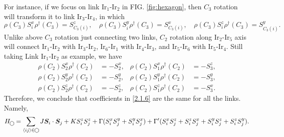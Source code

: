 \documentclass[10pt,nofootinbib]{revtex4}
\newcommand\hexagon{\mathop{\begin{tikzpicture}[scale=0.06,baseline]
		\draw (0,-1) -- (1.732,0) -- (1.732,2) -- (0,3) -- (-1.732,2) -- (-1.732,0) -- (0,-1);
	\end{tikzpicture}}}
\begin{document}
		For instance, if we focus on link $\mathrm{Ir}_1\text{-}\mathrm{Ir}_2$ in FIG. \ref{fig:hexagon}, then $C_3$ rotation will transform it to link $\mathrm{Ir}_3\text{-}\mathrm{Ir}_4$, in which
		\begin{equation}\label{2.2.2}
			\rho(C_3)S_i^x\rho^\dagger(C_3)=S_{C_3(i)}^z,\quad \rho(C_3)S_i^y\rho^\dagger(C_3)=S_{C_3(i)}^x,\quad \rho(C_3)S_i^z\rho^\dagger(C_3)=S_{C_3(i)}^y.
		\end{equation}
		Unlike above $C_3$ rotation just connecting two links, $C_2$ rotation along $\mathrm{Ir}_2\text{-}\mathrm{Ir}_5$ axis will connect $\mathrm{Ir}_1\text{-}\mathrm{Ir}_2$ with $\mathrm{Ir}_3\text{-}\mathrm{Ir}_2$, $\mathrm{Ir}_6\text{-}\mathrm{Ir}_1$ with $\mathrm{Ir}_4\text{-}\mathrm{Ir}_3$, and $\mathrm{Ir}_5\text{-}\mathrm{Ir}_6$ with $\mathrm{Ir}_5\text{-}\mathrm{Ir}_4$. Still taking Link $\mathrm{Ir}_1\text{-}\mathrm{Ir}_2$ as example, we have
		\begin{subequations}
			\begin{align}
				\rho(C_2)S_2^x\rho^\dagger(C_2)&=-S_2^x,&\rho(C_2)S_1^x\rho^\dagger(C_2)&=-S_3^z,\label{2.2.3(a)}\\
				\rho(C_2)S_2^y\rho^\dagger(C_2)&=-S_2^y,&\rho(C_2)S_1^y\rho^\dagger(C_2)&=-S_3^y,\label{2.2.3(b)}\\
				\rho(C_2)S_2^z\rho^\dagger(C_2)&=-S_2^z,&\rho(C_2)S_1^z\rho^\dagger(C_2)&=-S_3^x.\label{2.2.3(c)}
			\end{align}
		\end{subequations}
		Therefore, we conclude that coefficients in \eqref{2.1.6} are the same for all the links. Namely,
		\begin{equation}\label{2.2.4}
			H_{\hexagon}=\sum_{\langle ij \rangle\in\hexagon}J\bm{S}_i\cdot\bm{S}_j+KS_i^zS_j^z+\Gamma(S_i^xS_j^y+S_i^yS_j^x)+\Gamma'(S_i^xS_j^z+S_i^zS_j^x+S_i^yS_j^z+S_i^zS_j^y).
		\end{equation}

\iffalse
\end{document}
